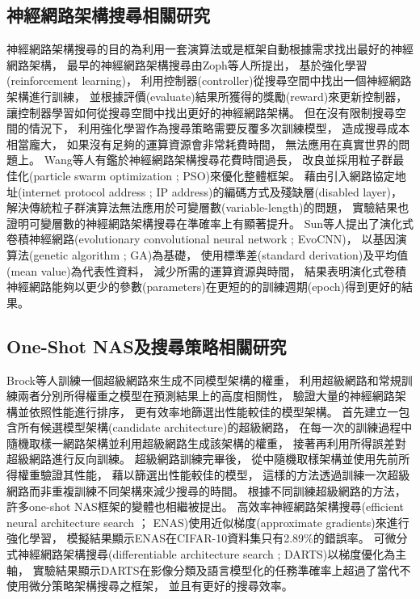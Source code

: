 \documentclass[a4paper,12pt]{extarticle}
\begin{document}
        \subsection{神經網路架構搜尋相關研究}
            
            神經網路架構搜尋的目的為利用一套演算法或是框架自動根據需求找出最好的神經網路架構，
            最早的神經網路架構搜尋由Zoph等人\cite{zoph2016neural}所提出，
            基於強化學習(reinforcement learning)，
            利用控制器(controller)從搜尋空間中找出一個神經網路架構進行訓練，
            並根據評價(evaluate)結果所獲得的獎勵(reward)來更新控制器，
            讓控制器學習如何從搜尋空間中找出更好的神經網路架構。
            但在沒有限制搜尋空間的情況下，
            利用強化學習作為搜尋策略需要反覆多次訓練模型，
            造成搜尋成本相當龐大，
            如果沒有足夠的運算資源會非常耗費時間，
            無法應用在真實世界的問題上。
            Wang等人\cite{8477735}有鑑於神經網路架構搜尋花費時間過長，
            改良並採用粒子群最佳化(particle swarm optimization ; PSO)來優化整體框架。
            藉由引入網路協定地址(internet protocol address ; IP address)的編碼方式及殘缺層(disabled layer)，
            解決傳統粒子群演算法無法應用於可變層數(variable-length)的問題，
            實驗結果也證明可變層數的神經網路架構搜尋在準確率上有顯著提升。
            Sun等人\cite{8712430}提出了演化式卷積神經網路(evolutionary convolutional neural network ; EvoCNN)，
            以基因演算法(genetic algorithm ; GA)為基礎，
            使用標準差(standard derivation)及平均值(mean value)為代表性資料，
            減少所需的運算資源與時間，
            結果表明演化式卷積神經網路能夠以更少的參數(parameters)在更短的的訓練週期(epoch)得到更好的結果。

        \subsection{One-Shot NAS及搜尋策略相關研究}
            
            Brock等人\cite{brock2017smash}訓練一個超級網路來生成不同模型架構的權重，
            利用超級網路和常規訓練兩者分別所得權重之模型在預測結果上的高度相關性，
            驗證大量的神經網路架構並依照性能進行排序，
            更有效率地篩選出性能較佳的模型架構。
            首先建立一包含所有候選模型架構(candidate architecture)的超級網路，
            在每一次的訓練過程中隨機取樣一網路架構並利用超級網路生成該架構的權重，
            接著再利用所得誤差對超級網路進行反向訓練。
            超級網路訓練完畢後，
            從中隨機取樣架構並使用先前所得權重驗證其性能，
            藉以篩選出性能較佳的模型，
            這樣的方法透過訓練一次超級網路而非重複訓練不同架構來減少搜尋的時間。
            根據不同訓練超級網路的方法，
            許多one-shot NAS框架的變體也相繼被提出。
            高效率神經網路架構搜尋(efficient neural architecture search ； ENAS)使用近似梯度(approximate gradients)\cite{pedregosa2016hyperparameter}來進行強化學習，
            模擬結果顯示ENAS在CIFAR-10資料集只有2.89\%的錯誤率。
            可微分式神經網路架構搜尋(differentiable architecture search ; DARTS)\cite{liu2018darts}以梯度優化為主軸，
            實驗結果顯示DARTS在影像分類及語言模型化的任務準確率上超過了當代不使用微分策略架構搜尋之框架，
            並且有更好的搜尋效率。
            
\end{document}
